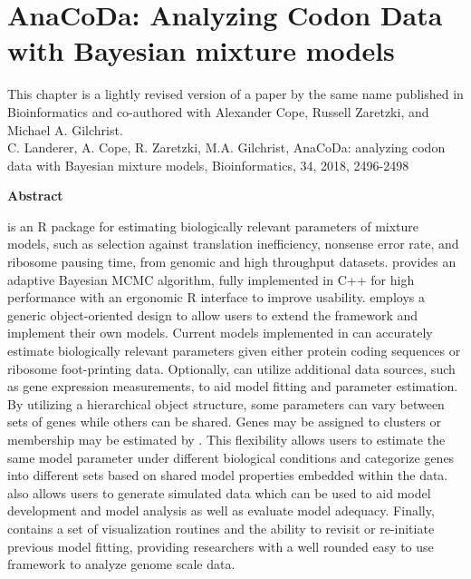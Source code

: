 \chapter{AnaCoDa: Analyzing Codon Data with Bayesian mixture models} 
\label{ch:anacoda}

This chapter is a lightly revised version of a paper by the same name published in Bioinformatics and co-authored with Alexander Cope, Russell Zaretzki, and Michael A. Gilchrist.\\
\newline
\newline
C. Landerer, A. Cope, R. Zaretzki, M.A. Gilchrist, AnaCoDa: analyzing codon data with Bayesian mixture models, Bioinformatics, 34, 2018, 2496-2498

\clearpage
\pagebreak


\begin{center}\textbf{Abstract}\end{center}
\textbf{\package} is an R package for estimating biologically relevant parameters of mixture models, such as selection against translation inefficiency, nonsense error rate, and ribosome pausing time, from genomic and high throughput datasets.
\package provides an adaptive Bayesian MCMC algorithm, fully implemented in C++ for high performance with an ergonomic R interface to improve usability. 
\package employs a generic object-oriented design to allow users to extend the framework and implement their own models.
Current models implemented in \package can accurately estimate biologically relevant parameters given either protein coding sequences or ribosome foot-printing data.
Optionally, \package can utilize additional data sources, such as gene expression measurements, to aid model fitting and parameter estimation.
By utilizing a hierarchical object structure, some parameters can vary between sets of genes while others can be shared.
Genes may be assigned to clusters or membership may be estimated by \package.
This flexibility allows users to estimate the same model parameter under different biological conditions and categorize genes into different sets based on shared model properties embedded within the data.
\package also allows users to generate simulated data which can be used to aid model development and model analysis as well as evaluate model adequacy.
Finally, \package contains a set of visualization routines and the ability to revisit or re-initiate previous model fitting, providing researchers with a well rounded easy to use framework to analyze genome scale data.


